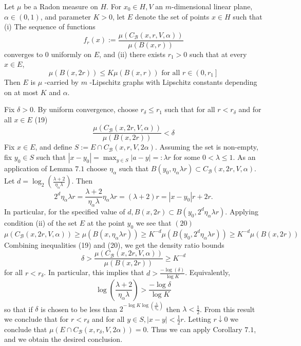 \begin{lemma}[Lemma 7.2]
    Let $\mu$ be a Radon measure on $H$. For $x_{0} \in H, V$ an $m$-dimensional linear plane, $\alpha \in(0,1)$, and parameter $K>0$, let $E$ denote the set of points $x \in H$ such that
(i) The sequence of functions
$$
f_{r}(x):=\frac{\mu\left(C_{\mathcal{B}}(x, r, V, \alpha)\right)}{\mu(B(x, r))}
$$
converges to 0 uniformly on $E$, and
(ii) there exists $r_{1}>0$ such that at every $x \in E$,
$$
\mu(B(x, 2 r)) \leq K \mu(B(x, r)) \text { for all } r \in\left(0, r_{1}\right]
$$
Then $E$ is $\mu$ -carried by $m$ -Lipschitz graphs with Lipschitz constants depending on at most $K$ and $\alpha .$
\end{lemma}
\proof Fix $\delta>0$. By uniform convergence, choose $r_{\delta} \leq r_{1}$ such that for all $r<r_{\delta}$ and for all $x \in E$
(19)
$$
\frac{\mu\left(C_{\mathcal{B}}(x, 2 r, V, \alpha)\right)}{\mu(B(x, 2 r))}<\delta
$$
Fix $x \in E$, and define $S:=E \cap C_{\mathcal{B}}(x, r, V, 2 \alpha)$. Assuming the set is non-empty, fix $y_{0} \in S$ such that $\left|x-y_{0}\right|=\max _{y \in S}|a-y|=: \lambda r$ for some $0<\lambda \leq 1$. As an application of Lemma $7.1$ choose $\eta_{\alpha}$ such that $B\left(y_{0}, \eta_{\alpha} \lambda r\right) \subset C_{\mathcal{B}}(x, 2 r, V, \alpha) .$ Let $d=\log _{2}\left(\frac{\lambda+2}{\eta_{\alpha} \lambda}\right)$. Then
$$
2^{d} \eta_{\alpha} \lambda r=\frac{\lambda+2}{\eta_{\alpha} \lambda} \eta_{\alpha} \lambda r=(\lambda+2) r=\left|x-y_{0}\right| r+2 r .
$$
In particular, for the specified value of $d, B(x, 2 r) \subset B\left(y_{0}, 2^{d} \eta_{\alpha} \lambda r\right) .$ Applying condition (ii) of the set $E$ at the point $y_{0}$ we see that
$(20)$
$\mu\left(C_{\mathcal{B}}(x, 2 r, V, \alpha)\right) \geq \mu\left(B\left(x, \eta_{\alpha} \lambda r\right)\right) \geq K^{-d} \mu\left(B\left(y_{0}, 2^{d} \eta_{\alpha} \lambda r\right)\right) \geq K^{-d} \mu(B(x, 2 r))$
Combining inequalities (19) and (20), we get the density ratio bounds
$$
\delta>\frac{\mu\left(C_{\mathcal{B}}(x, 2 r, V, \alpha)\right)}{\mu(B(x, 2 r))} \geq K^{-d}
$$
for all $r<r_{\delta}$. In particular, this implies that $d>\frac{-\log (\delta)}{\log K}$. Equivalently,
$$
\log \left(\frac{\lambda+2}{\eta_{\alpha} \lambda}\right)>\frac{-\log \delta}{\log K}
$$
so that if $\delta$ is chosen to be less than $2^{-\log K \log \left(\frac{5}{\eta_{\alpha}}\right)}$ then $\lambda<\frac{1}{2}$. From this result we conclude that for $r<r_{\delta}$ and for all $y \in S,|x-y|<\frac{1}{2} r$. Letting $r \downarrow 0$ we conclude that $\mu\left(E \cap C_{\mathcal{B}}\left(x, r_{\delta}, V, 2 \alpha\right)\right)=0$. Thus we can apply Corollary $7.1$, and we obtain the desired conclusion. 


